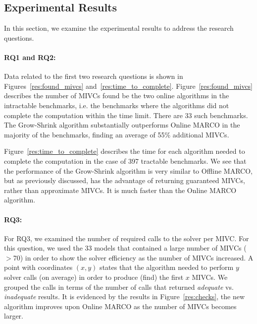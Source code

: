 \subsection{Experimental Results}
In this section, we examine the experimental results to address the research questions.

\paragraph{RQ1 and RQ2:}
Data related to the first two research questions is shown in Figures~\ref{res:found_mivcs} and~\ref{res:time_to_complete}.
Figure~\ref{res:found_mivcs} describes the number of MIVCs found be the two online algorithms in the intractable benchmarks, i.e. the benchmarks where the algorithms did not complete the computation within the time limit. There are 33 such benchmarks.
The Grow-Shrink algorithm substantially outperforms Online MARCO in the majority of the benchmarks, finding an average of 55\% additional MIVCs.

Figure~\ref{res:time_to_complete} describes the time for each algorithm needed to complete the computation in the case of 397 tractable benchmarks. We see that the performance of the Grow-Shrink algorithm is very similar to Offline MARCO, but as previously discussed, has the advantage of returning guaranteed MIVCs, rather than approximate MIVCs.  It is much faster than the Online MARCO algorithm.%


\paragraph{RQ3:}  For RQ3, we examined the number of required calls to the solver per MIVC.  For this question, we used the 33 models that contained a large number of MIVCs ($>$70) in order to show the solver efficiency as the number of MIVCs increased.  A point with coordinates $(x,y)$ states that the algorithm needed to perform $y$ solver calls (on average) in order to produce (find) the first $x$ MIVCs. We grouped the calls in terms of the number of calls that returned {\em adequate} vs. {\em inadequate} results.  It is evidenced by the results in Figure~\ref{res:checks}, the new algorithm improves upon Online MARCO as the number of MIVCs becomes larger.

